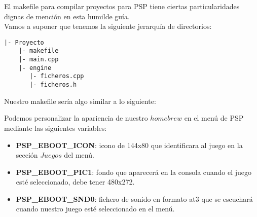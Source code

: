 El makefile para compilar proyectos para PSP tiene ciertas particularidades
dignas de mención en esta humilde guía.\\

Vamos a suponer que tenemos la siguiente jerarquía de directorios:

\begin{verbatim}
|- Proyecto
    |- makefile
    |- main.cpp
    |- engine
       |- ficheros.cpp
       |- ficheros.h
\end{verbatim}

Nuestro makefile sería algo similar a lo siguiente:



Podemos personalizar la apariencia de nuestro $homebrew$ en el menú de PSP
mediante las siguientes variables:

\begin{itemize}
	\item \textbf{PSP\_EBOOT\_ICON}: icono de 144x80 que identificara al
	juego en la sección $Juegos$ del menú.
	\item \textbf{PSP\_EBOOT\_PIC1}: fondo que aparecerá en la consola cuando
	el juego esté seleccionado, debe tener 480x272.
	\item \textbf{PSP\_EBOOT\_SND0}: fichero de sonido en formato at3
	que se escuchará cuando nuestro juego esté seleccionado en el menú.
\end{itemize}
